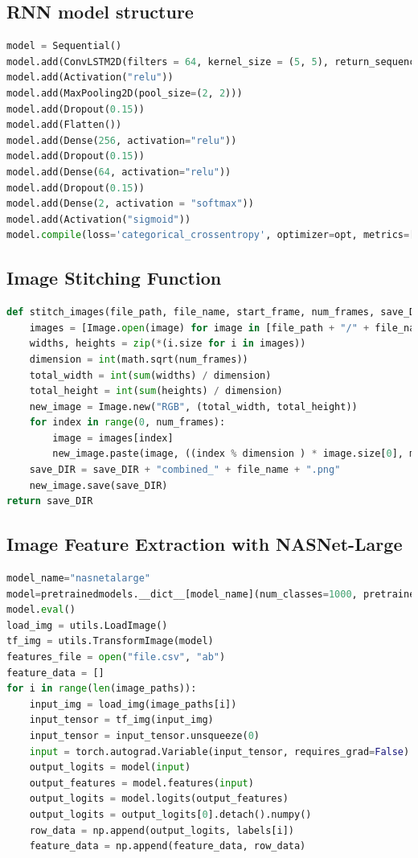 \documentclass[12pt]{article}
\numberwithin{figure}{section} %
\begin{document}
\subsection{RNN model structure}
\begin{lstlisting}[language = Python]
model = Sequential()
model.add(ConvLSTM2D(filters = 64, kernel_size = (5, 5), return_sequences = False, data_format = "channels_last", input_shape = X.shape[1:]))
model.add(Activation("relu"))
model.add(MaxPooling2D(pool_size=(2, 2)))
model.add(Dropout(0.15))
model.add(Flatten())
model.add(Dense(256, activation="relu"))
model.add(Dropout(0.15))
model.add(Dense(64, activation="relu"))
model.add(Dropout(0.15))
model.add(Dense(2, activation = "softmax"))
model.add(Activation("sigmoid"))
model.compile(loss='categorical_crossentropy', optimizer=opt, metrics=["accuracy"])
\end{lstlisting}

\subsection{Image Stitching Function}
\begin{lstlisting}[language = Python]
def stitch_images(file_path, file_name, start_frame, num_frames, save_DIR):
    images = [Image.open(image) for image in [file_path + "/" + file_name + str(x) + ".png" for x in range(start_frame, start_frame + num_frames)]]
    widths, heights = zip(*(i.size for i in images))
    dimension = int(math.sqrt(num_frames))
    total_width = int(sum(widths) / dimension)
    total_height = int(sum(heights) / dimension)
    new_image = Image.new("RGB", (total_width, total_height))
    for index in range(0, num_frames):
        image = images[index]
        new_image.paste(image, ((index % dimension ) * image.size[0], math.floor(index / dimension) * image.size[1]))
    save_DIR = save_DIR + "combined_" + file_name + ".png"
    new_image.save(save_DIR)
return save_DIR
\end{lstlisting}

\subsection{Image Feature Extraction with NASNet-Large}
\begin{lstlisting}[language = Python]
model_name="nasnetalarge"
model=pretrainedmodels.__dict__[model_name](num_classes=1000, pretrained='imagenet')
model.eval()
load_img = utils.LoadImage()
tf_img = utils.TransformImage(model)
features_file = open("file.csv", "ab")
feature_data = []
for i in range(len(image_paths)):
    input_img = load_img(image_paths[i])
    input_tensor = tf_img(input_img)
    input_tensor = input_tensor.unsqueeze(0)
    input = torch.autograd.Variable(input_tensor, requires_grad=False)
    output_logits = model(input)
    output_features = model.features(input)
    output_logits = model.logits(output_features)
    output_logits = output_logits[0].detach().numpy()
    row_data = np.append(output_logits, labels[i])
    feature_data = np.append(feature_data, row_data)
\end{lstlisting}
\end{document}
